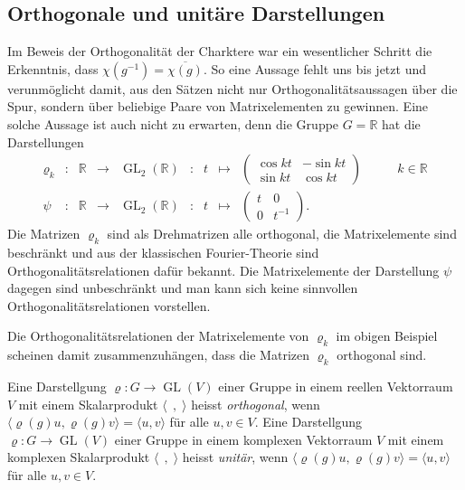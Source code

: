 %
%
%

%
%
\subsection{Orthogonale und unitäre Darstellungen
\label{buch:gruppen:darstellung:subsection:orthouni}}
Im Beweis der Orthogonalität der Charktere war ein wesentlicher
Schritt die Erkenntnis, dass $\chi(g^{-1})=\overline{\chi(g)}$.
So eine Aussage fehlt uns bis jetzt und verunmöglicht damit, aus
den Sätzen
nicht nur Orthogonalitätsaussagen über die Spur, sondern über 
beliebige Paare von Matrixelementen zu gewinnen.
Eine solche Aussage ist auch nicht zu erwarten, denn die Gruppe
$G=\mathbb{R}$ hat die Darstellungen
\begin{equation}
\renewcommand{\arraycolsep}{3pt}
\begin{array}{rclclclcll}
\varrho_k
&\colon&
\mathbb{R} &\to& \operatorname{GL}_2(\mathbb{R})
&:&
t &\mapsto& \begin{pmatrix} \cos kt&-\sin kt\\\sin kt&\cos kt\end{pmatrix}
&\qquad k\in\mathbb{R}
\\
\psi
&\colon&
\mathbb{R} &\to& \operatorname{GL}_2(\mathbb{R})
&:&
t &\mapsto& \begin{pmatrix} t&0\\0&t^{-1}\end{pmatrix}.
&
\end{array}
\end{equation}
Die Matrizen $\varrho_k$ sind als Drehmatrizen alle orthogonal, die
Matrixelemente sind beschränkt und aus der klassischen Fourier-Theorie
sind Orthogonalitätsrelationen dafür bekannt.
Die Matrixelemente der Darstellung $\psi$ dagegen sind unbeschränkt und
man kann sich keine sinnvollen Orthogonalitätsrelationen vorstellen.

Die Orthogonalitätsrelationen der Matrixelemente von $\varrho_k$ 
im obigen Beispiel scheinen damit zusammenzuhängen, dass die Matrizen
$\varrho_k$ orthogonal sind.

\begin{definition}
Eine Darstellgung $\varrho\colon G\to\operatorname{GL}(V)$ einer
Gruppe in einem reellen Vektorraum $V$ mit einem Skalarprodukt
$\langle\;\,,\;\rangle$ heisst {\em orthogonal}, wenn
$\langle\varrho(g)u,\varrho(g)v\rangle=\langle u,v\rangle$
für alle $u,v\in V$.
Eine Darstellgung $\varrho\colon G\to\operatorname{GL}(V)$ einer
Gruppe in einem komplexen Vektorraum $V$ mit einem komplexen
Skalarprodukt $\langle\;\,,\;\rangle$ heisst {\em unitär}, wenn
$\langle\varrho(g)u,\varrho(g)v\rangle=\langle u,v\rangle$
für alle $u,v\in V$.
\end{definition}

